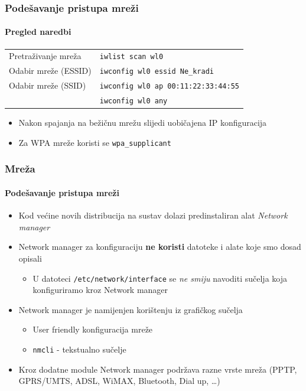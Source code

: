 \documentclass[table,usenames,dvipsnames]{beamer}
\newcommand{\shell}[1]{\texttt{#1}}
\begin{document}
\begin{frame}[t]
	\frametitle{Podešavanje pristupa mreži}
	\framesubtitle{Pregled naredbi}
	\begin{table}[h]
		\begin{tabular}{l l}
			Pretraživanje mreža & \shell{iwlist scan wl0}\\
			Odabir mreže (ESSID) & \shell{iwconfig wl0 essid Ne\_kradi}\\
			Odabir mreže (SSID) & \shell{iwconfig wl0 ap 00:11:22:33:44:55}\\
			& \shell{iwconfig wl0 any}\\
		\end{tabular}
	\end{table}
	
	\begin{itemize}
		\item Nakon spajanja na bežičnu mrežu slijedi uobičajena IP konfiguracija
		\item Za WPA mreže koristi se \shell{wpa\_supplicant}
	\end{itemize}
\end{frame}

\begin{frame}[t]
	\frametitle{Mreža}
	\framesubtitle{Podešavanje pristupa mreži}
	\begin{itemize}
		\item Kod većine novih distribucija na sustav dolazi predinstaliran alat \emph{Network manager}
		\item Network manager za konfiguraciju \textbf{ne koristi} datoteke i alate koje smo dosad opisali
		\begin{itemize}
			\item U datoteci \shell{/etc/network/interface} se \emph{ne smiju} navoditi sučelja koja konfiguriramo kroz Network manager
		\end{itemize}
		\item Network manager je namijenjen korištenju iz grafičkog sučelja
		\begin{itemize}
			\item User friendly konfiguracija mreže
			\item \shell{nmcli} - tekstualno sučelje
		\end{itemize}
		\item Kroz dodatne module Network manager podržava razne vrste mreža {\small (PPTP, GPRS/UMTS, ADSL, WiMAX, Bluetooth, Dial up, \ldots)}
	\end{itemize}
\end{frame}
\end{document}
